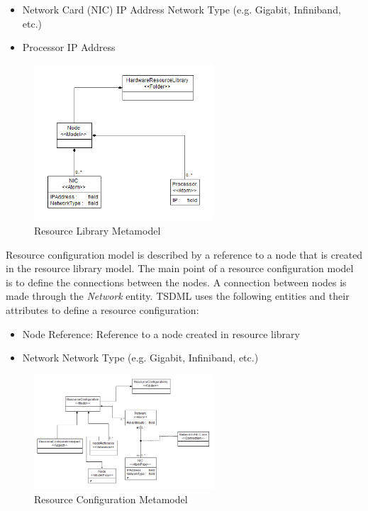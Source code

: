 \begin{itemize}
	\item Network Card (NIC)
	\subitem IP Address
	\subitem Network Type (e.g. Gigabit, Infiniband, etc.)
	\item Processor
	\subitem IP Address
\end{itemize}

\begin{figure}
	\centering
		\includegraphics[width=0.60\textwidth]{figures/ResourceLibraryMeta.png}
	\caption{Resource Library Metamodel}
	\label{fig:ResourceLibraryMeta}
\end{figure}


Resource configuration model is described by a reference to a node that is created in the resource library model. The main point of a resource configuration model is to define the connections between the nodes. A connection between nodes is made through the \textit{Network} entity. TSDML uses the following entities and their attributes to define a resource configuration:

\begin{itemize}
	\item Node Reference: Reference to a node created in resource library
	\item Network
	\subitem Network Type (e.g. Gigabit, Infiniband, etc.)
\end{itemize}

\begin{figure}
	\centering
		\includegraphics[width=0.60\textwidth]{figures/ResourceConfigMeta.png}
	\caption{Resource Configuration Metamodel}
	\label{fig:ResourceConfigMeta}
\end{figure}


